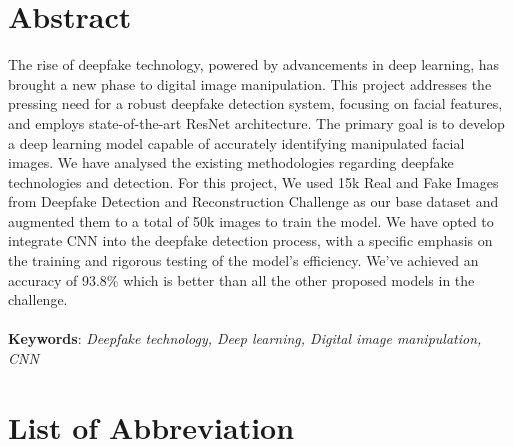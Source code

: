 \large
\chapter*{Abstract}
The rise of deepfake technology, powered by advancements in deep learning, has brought a new phase to digital image manipulation. This project addresses the pressing need for a robust deepfake detection system, focusing on facial features, and employs state-of-the-art ResNet architecture. The primary goal is to develop a deep learning model capable of accurately identifying manipulated facial images. We have analysed the existing methodologies regarding deepfake technologies and detection. For this project, We used 15k Real and Fake Images from Deepfake Detection and Reconstruction Challenge as our base dataset and augmented them to a total of 50k images to train the model. We have opted to integrate CNN into the deepfake detection process, with a specific emphasis on the training and rigorous testing of the model's efficiency. We've achieved an accuracy of 93.8\% which is better than all the other proposed models in the challenge.\\\\
\textbf{Keywords}: \textit{Deepfake technology, Deep learning, Digital image manipulation, CNN}
\pagebreak

\tableofcontents
\listoffigures
{}
\listoftables
{}
\pagebreak

\Large
\begingroup
\let\clearpage\relax
\chapter*{List of Abbreviation}
\endgroup
\normalsize
{}

